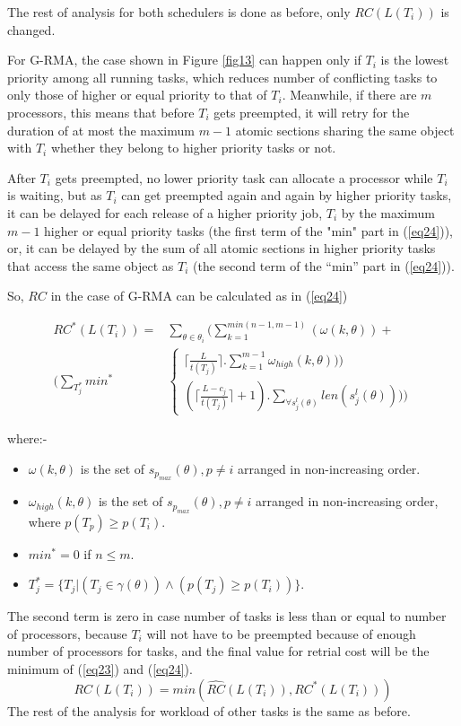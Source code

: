 \documentclass[a4paper,english]{article}
\begin{document}
The rest of analysis for both schedulers is done as before, only $RC(L(T_{i}))$
is changed.

\textbf{\textit{}}

For G-RMA, the case shown in Figure \ref{fig13} can happen only if $T_{i}$ is the lowest
priority among all running tasks, which reduces number of conflicting
tasks to only those of higher or equal priority to that of $T_{i}$.
Meanwhile, if there are $m$ processors, this means that before $T_{i}$
gets preempted, it will retry for the duration of at most the maximum
$m-1$ atomic sections sharing the same object with $T_{i}$ whether they belong to higher priority tasks or not.

After $T_{i}$ gets preempted, no lower priority task can allocate
a processor while $T_{i}$ is waiting, but as $T_{i}$ can get preempted
again and again by higher priority tasks, it can be delayed for each release of a higher priority
job, $T_{i}$ by the maximum $m-1$ higher or equal priority tasks (the first term of the "min" part in (\ref{eq24})), or, it can be delayed by the sum of all atomic sections in higher priority tasks that access the same object as $T_{i}$ (the second term of the ``min'' part in (\ref{eq24})).

So, $RC$ in the case of G-RMA can be calculated as in
(\ref{eq24})

\begin{eqnarray}
RC^{*}(L(T_{i}))= & \sum_{\theta\in\theta_{i}}(\sum_{k=1}^{min(n-1,m-1)}(\omega(k,\theta))+\nonumber \\
(\sum_{T_{j}^*}min^* & \begin{cases}
\lceil\frac{L}{t(T_{j})}\rceil.\sum_{k=1}^{m-1}\omega_{high}(k,\theta)))\\
(\lceil\frac{L-c_{j}}{t(T_{j})}\rceil+1).\sum_{\forall s_{j}^{l}(\theta)}len(s_{j}^{l}(\theta))))\end{cases}\label{eq24}\end{eqnarray}



where:-
\begin{itemize}
\item $\omega(k,\theta)$ is the set of $s_{p_{max}}(\theta), p \ne i $ arranged
in non-increasing order. 
\item $\omega_{high}(k,\theta)$ is the set of $s_{p_{max}}(\theta), p \ne i $ arranged
in non-increasing order, where $p(T_{p})\ge p(T_{i})$.
\item $min^* = 0$ if $n\le m$.
\item $T_j^* = \{T_j|(T_{j}\in\gamma(\theta))\wedge(p(T_{j})\ge p(T_{i}))\}$.
\end{itemize}
The second term is zero in case number of tasks is less than or equal
to number of processors, because $T_{i}$ will not have to be preempted
because of enough number of processors for tasks, and the final value for retrial cost will be the minimum of (\ref{eq23}) and (\ref{eq24}).
\begin{equation}
RC(L(T_i))=min(\hat{RC}(L(T_i)),RC^{*}(L(T_i)))\label{eq26}
\end{equation}
 The rest of the
analysis for workload of other tasks is the same as before.
\end{document}
